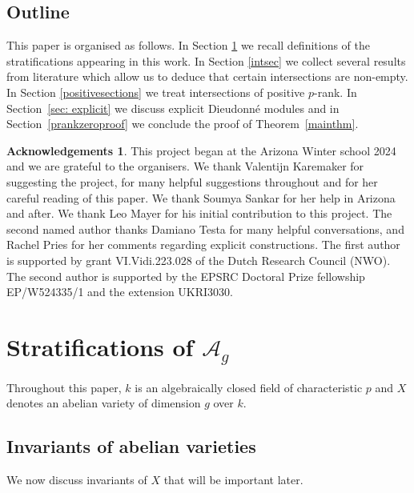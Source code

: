 \documentclass[11pt,table]{amsart}
\numberwithin{equation}{section}
\theoremstyle{definition}
\newtheorem*{Ack}{Acknowledgements}
\theoremstyle{remark}
\theoremstyle{remark}
\begin{document}
\subsection{Outline} This paper is organised as follows. In Section \ref{stratsdefs} we recall definitions of the stratifications appearing in this work. In Section \ref{intsec} we collect several results from literature which allow us to deduce that certain intersections are non-empty. 
In Section \ref{positivesections} we treat intersections of positive $p$-rank. In Section~\ref{sec: explicit} we discuss explicit Dieudonn\'{e} modules and in Section~\ref{prankzeroproof} we conclude the proof of Theorem~\ref{mainthm}.
  \begin{Ack}
This project began at the Arizona Winter school 2024 and we are grateful to the organisers. We thank Valentijn Karemaker for suggesting the project, for many helpful suggestions  throughout and for her careful reading of this paper. We thank Soumya Sankar for her help in Arizona and after. We thank Leo Mayer for his initial contribution to this project. The second  named author thanks Damiano Testa  for many helpful conversations, and Rachel Pries for her comments regarding explicit constructions. The first author is supported by grant VI.Vidi.223.028 of the Dutch Research Council (NWO). 
The second author is supported by the EPSRC Doctoral Prize fellowship EP/W524335/1 and the extension UKRI3030.
 \end{Ack}




\section{Stratifications of  $\mathcal{A}_{g}$} \label{stratsdefs}

Throughout this paper, $k$ is an algebraically closed field of characteristic $p$ and $X$ denotes an abelian variety of dimension $g$ over $k$.
\subsection{Invariants of abelian varieties}

We now discuss invariants of $X$ that will be important later.
\end{document}
